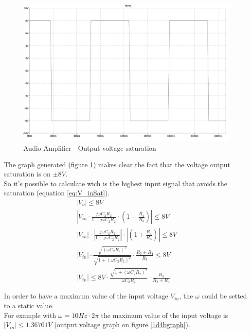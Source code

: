 \documentclass[10pt,a4paper]{article}
\begin{document}
\begin{figure}[H]
  \centering
  \includegraphics[width=14cm]{graph/1d4.jpg}
  \caption{Audio Amplifier - Output voltage saturation}
  \label{1d4graph}
\end{figure}
The graph generated (figure \ref{1d4graph}) makes clear the fact that the voltage output saturation is on $\pm8V$.\\
So it's possible to calculate wich is the highest input signal that avoids the saturation (equation \ref{eq:V_inSat}).\\

\begin{align}
|V_o| \leq 8V \nonumber \\
\left|V_{in}\cdot \frac{j\omega C_2R_2}{1+j\omega C_2R_2} \cdot \left(1 + \frac{R_4}{R_3} \right) \right| \leq 8V \nonumber \\
|V_{in}|\cdot \left|\frac{j\omega C_2R_2}{1+j\omega C_2R_2} \right| \cdot \left| \left(1 + \frac{R_4}{R_3} \right) \right| \leq 8V \nonumber \\
|V_{in}|\cdot \frac{\sqrt{(\omega C_2R_2)^2}}{\sqrt{1+(\omega C_2R_2)^2}} \cdot \frac{R_3 + R_4}{R_3} \leq 8V \nonumber \\
|V_{in}| \leq 8V \cdot \frac{\sqrt{1+(\omega C_2R_2)^2}}{\omega C_2R_2} \cdot \frac{R_3}{R_3 + R_4} \label{eq:V_inSat}
\end{align}

In order to have a maximum value of the input voltage $V_{in}$, the $\omega$ could be setted to a static value.\\
For example with $\omega = 10Hz \cdot 2\pi$ the maximum value of the input voltage is $|V_{in}| \leq 1.36701V$ (output voltage graph on figure \ref{1d4bgraph}).
\end{document}
